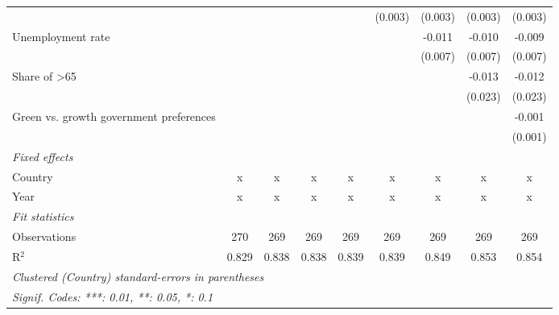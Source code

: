 \begin{table}[htbp]
\begin{tabular}{lcccccccc}
                                                                               &         &         &         &         & (0.003) & (0.003) & (0.003)      & (0.003)\\   
      Unemployment rate                                                        &         &         &         &         &         & -0.011  & -0.010       & -0.009\\   
                                                                               &         &         &         &         &         & (0.007) & (0.007)      & (0.007)\\   
      Share of >65                                                             &         &         &         &         &         &         & -0.013       & -0.012\\   
                                                                               &         &         &         &         &         &         & (0.023)      & (0.023)\\   
      Green vs. growth government preferences                                  &         &         &         &         &         &         &              & -0.001\\   
                                                                               &         &         &         &         &         &         &              & (0.001)\\   
      \emph{Fixed effects}\\
      Country                                                                  & x       & x       & x       & x       & x       & x       & x            & x\\  
      Year                                                                     & x       & x       & x       & x       & x       & x       & x            & x\\  
      \midrule \emph{Fit statistics}\\
      Observations                                                             & 270     & 269     & 269     & 269     & 269     & 269     & 269          & 269\\  
      R$^2$                                                                    & 0.829   & 0.838   & 0.838   & 0.839   & 0.839   & 0.849   & 0.853        & 0.854\\  
      \midrule
      \multicolumn{9}{l}{\emph{Clustered (Country) standard-errors in parentheses}}\\
      \multicolumn{9}{l}{\emph{Signif. Codes: ***: 0.01, **: 0.05, *: 0.1}}\\
   \end{tabular}
\end{table}


